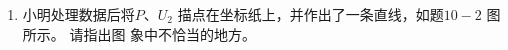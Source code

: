 \begin{enumerate}
\begin{enumerate}
\item 
小明处理数据后将$ P $、$ U_{2} $ 描点在坐标纸上，并作出了一条直线，如题$ 10-2 $ 图所示。 请指出图
象中不恰当的地方。


\end{enumerate}





\end{enumerate}
